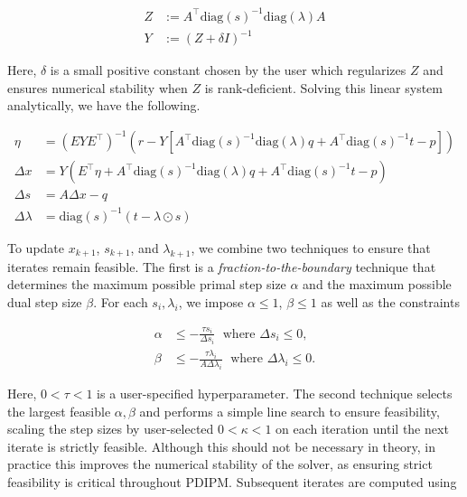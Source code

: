 \documentclass[12pt,titlepage]{report}
\begin{document}
	\begin{align}
		Z &:= A^\top \mathrm{diag}(s)^{-1} \mathrm{diag}(\lambda) A \\
		Y &:= \left(Z + \delta I \right)^{-1}
	\end{align}
	
	Here, \( \delta \) is a small positive constant chosen by the user which regularizes \( Z \) and ensures numerical stability when \( Z \) is rank-deficient.  Solving this linear system analytically, we have the following.
	
	\begin{align}
		\eta &= \left( E Y E^\top \right)^{-1} \left( r - Y \left[ A^\top \mathrm{diag}(s)^{-1} \mathrm{diag}(\lambda) q + A^\top \mathrm{diag}(s)^{-1} t - p \right] \right) \\
		\Delta x &= Y \left( E^\top \eta + A^\top \mathrm{diag}(s)^{-1} \mathrm{diag}(\lambda) q + A^\top \mathrm{diag}(s)^{-1} t - p \right) \\
		\Delta s &= A \Delta x - q \\
		\Delta \lambda &= \mathrm{diag}(s)^{-1} \left( t - \lambda \odot s \right)
	\end{align}
	
	To update \( x_{k+1} \), \( s_{k+1} \), and \( \lambda_{k+1} \), we combine two techniques to ensure that iterates remain feasible.  The first is a \textit{fraction-to-the-boundary} technique that determines the maximum possible primal step size \( \alpha \) and the maximum possible dual step size \( \beta \).  For each \( s_i, \lambda_i \), we impose \( \alpha \le 1 \), \( \beta \le 1 \) as well as the constraints
	
	\begin{align}
		\alpha &\le -\frac{\tau s_i}{\Delta s_i} \; \text{ where } \Delta s_i \le 0 , \\
		\beta &\le -\frac{\tau \lambda_i}{A \Delta \lambda_i} \; \text{ where } \Delta \lambda_i \le 0 .
	\end{align}
	
	Here, \( 0 < \tau < 1 \) is a user-specified hyperparameter.  The second technique selects the largest feasible \( \alpha, \beta \) and performs a simple line search to ensure feasibility, scaling the step sizes by user-selected \( 0 < \kappa < 1 \) on each iteration until the next iterate is strictly feasible.  Although this should not be necessary in theory, in practice this improves the numerical stability of the solver, as ensuring strict feasibility is critical throughout PDIPM.  Subsequent iterates are computed using
	
\end{document}
